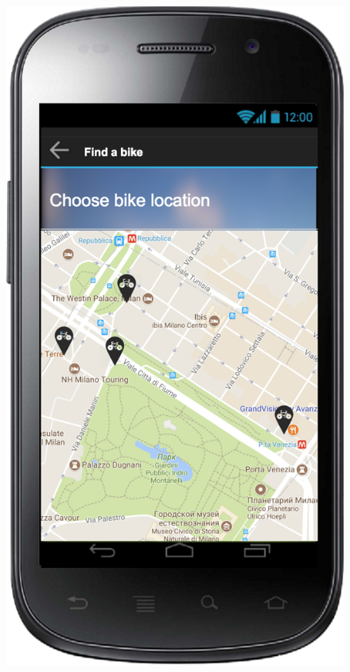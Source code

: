 \documentclass[a4paper,leqno]{article}
\begin{document}
\begin{figure}
	\begin{minipage}[!h]{0.45\linewidth}
		\centering
		\includegraphics[scale = 0.15]{findBike.png}
	\end{minipage}
	
	\vspace{3.5 cm}
	

\end{figure}
\end{document}
